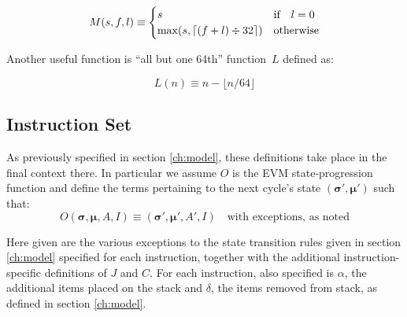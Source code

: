 \documentclass[9pt,oneside]{amsart}
\DeclarePairedDelimiter{\ceil}{\lceil}{\rceil}
\begin{document}
\begin{equation}
M(s, f, l) \equiv \begin{cases}
s & \text{if} \quad l = 0 \\
\max(s, \ceil{ (f + l) \div 32 }) & \text{otherwise}
\end{cases}
\end{equation}

Another useful function is ``all but one 64th'' function~$L$ defined as:

\begin{equation}
L(n) \equiv n - \lfloor n / 64 \rfloor
\end{equation}

\subsection{Instruction Set}

As previously specified in section \ref{ch:model}, these definitions take place in the final context there. In particular we assume $O$ is the EVM state-progression function and define the terms pertaining to the next cycle's state $(\boldsymbol{\sigma}', \boldsymbol{\mu}')$ such that:
\begin{equation}
O(\boldsymbol{\sigma}, \boldsymbol{\mu}, A, I) \equiv (\boldsymbol{\sigma}', \boldsymbol{\mu}', A', I) \quad \text{with exceptions, as noted}
\end{equation}

Here given are the various exceptions to the state transition rules given in section \ref{ch:model} specified for each instruction, together with the additional instruction-specific definitions of $J$ and $C$. For each instruction, also specified is $\alpha$, the additional items placed on the stack and $\delta$, the items removed from stack, as defined in section \ref{ch:model}.
\end{document}
